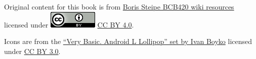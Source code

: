 \documentclass[]{book}
\begin{document}
Original content for this book is from
\href{http://steipe.biochemistry.utoronto.ca/abc/index.php/Computational_Systems_Biology_Main_Page}{Boris
Steipe BCB420 wiki resources} licensed under
\includegraphics{images/cc_icon.png}
\href{https://creativecommons.org/licenses/by/4.0/}{CC BY 4.0}.

Icons are from the
\href{https://www.iconfinder.com/iconsets/very-basic-android-l-lollipop}{``Very
Basic. Android L Lollipop'' set by Ivan Boyko} licensed under
\href{https://creativecommons.org/licenses/by/3.0/}{CC BY 3.0}.


\end{document}
